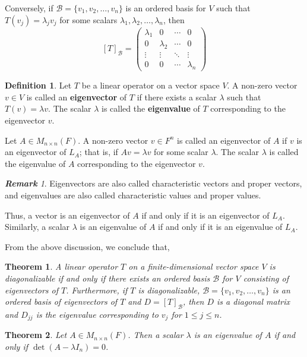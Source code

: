 \documentclass[12pt, a4paper]{article}
\newtheorem{theorem}{Theorem}[section]
\theoremstyle{definition}
\newtheorem{definition}{Definition}[section]
\theoremstyle{remark}
\newtheorem*{remark}{\textbf{Remark}}
\newcommand{\B}{\mathscr{B}}
\begin{document}
Conversely, if $\B = \{v_1, v_2, \dots, v_n\}$ is an ordered basis for $V$ such that $T(v_j) = \lambda_j v_j$ for some scalars $\lambda_1, \lambda_2, \dots, \lambda_n$, then
\[
[T]_\B = \begin{pmatrix}
\lambda_1 & 0 & \cdots & 0 \\
0 & \lambda_2 & \cdots & 0 \\
\vdots & \vdots & \ddots & \vdots \\
0 & 0 & \cdots & \lambda_n
\end{pmatrix}
\]

\begin{definition}
Let $T$ be a linear operator on a vector space $V$. A non-zero vector $v \in V$ is called an \textbf{eigenvector} of $T$ if there exists a scalar $\lambda$ such that $T(v) = \lambda v$. The scalar $\lambda$ is called the \textbf{eigenvalue} of $T$ corresponding to the eigenvector $v$.
\end{definition}

Let $A \in M_{n \times n}(F)$. A non-zero vector $v \in F^n$ is called an eigenvector of $A$ if $v$ is an eigenvector of $L_A$; that is, if $A v = \lambda v$ for some scalar $\lambda$. The scalar $\lambda$ is called the eigenvalue of $A$ corresponding to the eigenvector $v$.

\begin{remark}
Eigenvectors are also called characteristic vectors and proper vectors, and eigenvalues are also called characteristic values and proper values.
\end{remark}

Thus, a vector is an eigenvector of $A$ if and only if it is an eigenvector of $L_A$. Similarly, a scalar $\lambda$ is an eigenvalue of $A$ if and only if it is an eigenvalue of $L_A$.

From the above discussion, we conclude that,

\begin{theorem}
A linear operator $T$ on a finite-dimensional vector space $V$ is diagonalizable if and only if there exists an ordered basis $\B$ for $V$ consisting of eigenvectors of $T$. Furthermore, if $T$ is diagonalizable, $\B = \{v_1, v_2, \dots, v_n\}$ is an ordered basis of eigenvectors of $T$ and $D = [T]_\B$, then $D$ is a diagonal matrix and $D_{jj}$ is the eigenvalue corresponding to $v_j$ for $1 \le j \le n$.
\end{theorem}

\begin{theorem}
Let $A \in M_{n \times n}(F)$. Then a scalar $\lambda$ is an eigenvalue of $A$ if and only if $\det(A - \lambda I_n) = 0$.
\end{theorem}
\end{document}
